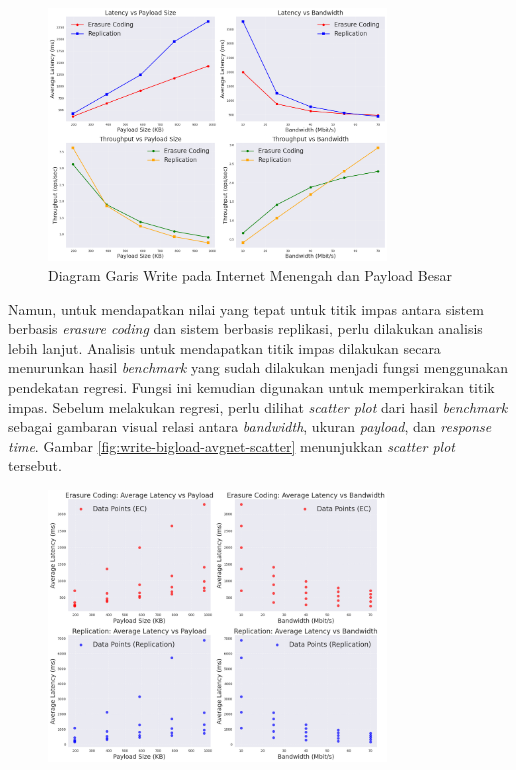 \begin{enumerate}
	      \begin{figure}[!htbp]
		      \centering
		      \includegraphics[width=0.8\textwidth]{resources/chapter-4/write_bigload_avgnet_line.png}

		      \caption{Diagram Garis Write pada Internet Menengah dan Payload Besar}
		      \label{fig:write-bigload-avgnet-line}
	      \end{figure}

	      Namun, untuk mendapatkan nilai yang tepat untuk titik impas antara sistem berbasis \textit{erasure coding} dan sistem berbasis replikasi, perlu dilakukan analisis lebih lanjut. Analisis untuk mendapatkan titik impas dilakukan secara menurunkan hasil \textit{benchmark} yang sudah dilakukan menjadi fungsi menggunakan pendekatan regresi. Fungsi ini kemudian digunakan untuk memperkirakan titik impas. Sebelum melakukan regresi, perlu dilihat \textit{scatter plot} dari hasil \textit{benchmark} sebagai gambaran visual relasi antara \textit{bandwidth}, ukuran \textit{payload}, dan \textit{response time}. Gambar \ref{fig:write-bigload-avgnet-scatter} menunjukkan \textit{scatter plot} tersebut.

	      \begin{figure}[ht]
		      \centering
		      \includegraphics[width=0.8\textwidth]{resources/chapter-4/write_bigload_avgnet_scatterplot.png}


\end{figure}
\end{enumerate}
